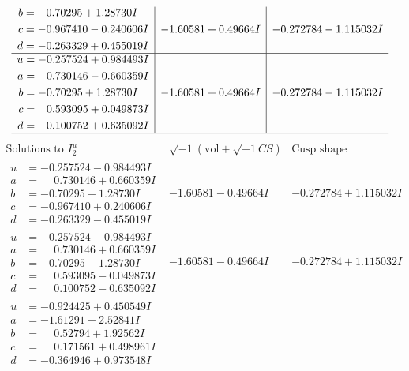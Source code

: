 \documentclass[1p]{elsarticle_modified}
\theoremstyle{definition}
\newcommand{\I}{\sqrt{-1}}
\begin{document}
$$\begin{array}{c|c|c}
\begin{aligned}
b &= -0.70295 + 1.28730 I \\
c &= -0.967410 - 0.240606 I \\
d &= -0.263329 + 0.455019 I\end{aligned}
 & -1.60581 + 0.49664 I & -0.272784 - 1.115032 I \\ \hline\begin{aligned}
u &= -0.257524 + 0.984493 I \\
a &= \phantom{-}0.730146 - 0.660359 I \\
b &= -0.70295 + 1.28730 I \\
c &= \phantom{-}0.593095 + 0.049873 I \\
d &= \phantom{-}0.100752 + 0.635092 I\end{aligned}
 & -1.60581 + 0.49664 I & -0.272784 - 1.115032 I\\
 \hline 
 \end{array}$$\newpage$$\begin{array}{c|c|c}  
\text{Solutions to }I^u_{2}& \I (\text{vol} + \sqrt{-1}CS) & \text{Cusp shape}\\
 \hline 
\begin{aligned}
u &= -0.257524 - 0.984493 I \\
a &= \phantom{-}0.730146 + 0.660359 I \\
b &= -0.70295 - 1.28730 I \\
c &= -0.967410 + 0.240606 I \\
d &= -0.263329 - 0.455019 I\end{aligned}
 & -1.60581 - 0.49664 I & -0.272784 + 1.115032 I \\ \hline\begin{aligned}
u &= -0.257524 - 0.984493 I \\
a &= \phantom{-}0.730146 + 0.660359 I \\
b &= -0.70295 - 1.28730 I \\
c &= \phantom{-}0.593095 - 0.049873 I \\
d &= \phantom{-}0.100752 - 0.635092 I\end{aligned}
 & -1.60581 - 0.49664 I & -0.272784 + 1.115032 I \\ \hline\begin{aligned}
u &= -0.924425 + 0.450549 I \\
a &= -1.61291 + 2.52841 I \\
b &= \phantom{-}0.52794 + 1.92562 I \\
c &= \phantom{-}0.171561 + 0.498961 I \\
d &= -0.364946 + 0.973548 I\end{aligned}

\end{array}$$
\end{document}
